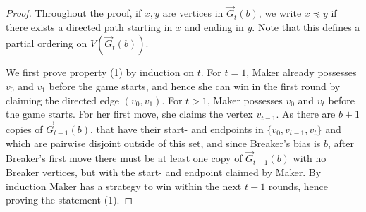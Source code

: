 \documentclass[reqno, 12pt]{amsart}
\numberwithin{equation}{section}
\numberwithin{figure}{section}
\begin{document}
\begin{proof}
Throughout the proof, if $x,y$ are vertices in $\vec{G}_t(b)$, we write $x \preccurlyeq y$ if there exists a
directed path starting in $x$ and ending in $y$. Note that this defines a partial ordering on $V(\vec{G}_t(b))$.

\medskip

We first prove property (1) by induction on $t$.
For $t=1$, Maker already possesses $v_0$ and $v_1$ before the game starts, and hence she can win in the first round by claiming the directed edge $(v_0,v_1)$.
For $t>1$, Maker possesses $v_0$ and $v_t$ before the game starts. For her first move, she claims the vertex $v_{t-1}$.
As there are $b+1$ copies of $\vec{G}_{t-1}(b)$,
that have their start- and endpoints in $\{v_0,v_{t-1},v_t\}$
and which are pairwise disjoint outside of this set,
and since Breaker's bias is $b$,
after Breaker's first move there must be at least
one copy of $\vec{G}_{t-1}(b)$ with no Breaker vertices,
but with the start- and endpoint claimed by Maker. By induction
Maker has a strategy to win within the next $t-1$ rounds,
hence proving the statement (1).

\medskip


\end{proof}
\end{document}
